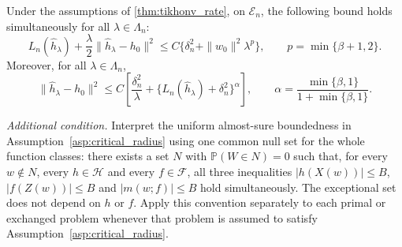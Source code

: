 \begin{lemma}\label{lemma:strong_convexity}
Under the assumptions of \cref{thm:tikhonv_rate}, on $\mathcal E_n$, the
following bound holds simultaneously for all $\lambda\in\Lambda_n$:
\[
L_n(\hat h_\lambda)+\frac{\lambda}{2}
\|\hat h_\lambda-h_0\|^2
\leqslant C\{\delta_n^2+\|w_0\|^2\lambda^p\},
\qquad p=\min\{\beta+1,2\}.
\]
Moreover, for all $\lambda\in\Lambda_n$,
\[
\|\hat h_\lambda-h_0\|^2
\leqslant C\left[\frac{\delta_n^2}{\lambda}
+\{L_n(\hat h_\lambda)+\delta_n^2\}^{\alpha}\right],
\qquad
\alpha=\frac{\min\{\beta,1\}}{1+\min\{\beta,1\}}.
\]

\emph{Additional condition.} Interpret the uniform almost-sure boundedness in Assumption~\ref{asp:critical_radius} using one common null set for the whole function classes: there exists a set $N$ with $\mathbb P(W\in N)=0$ such that, for every $w\notin N$, every $h\in\mathcal H$ and every $f\in\mathcal F$, all three inequalities $|h(X(w))|\leqslant B$, $|f(Z(w))|\leqslant B$ and $|m(w;f)|\leqslant B$ hold simultaneously. The exceptional set does not depend on $h$ or $f$. Apply this convention separately to each primal or exchanged problem whenever that problem is assumed to satisfy Assumption~\ref{asp:critical_radius}.
\end{lemma}

